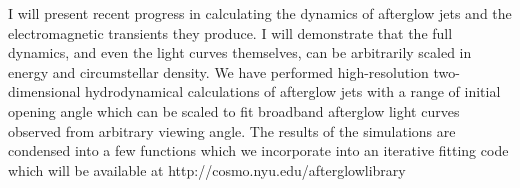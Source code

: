 


\bigskip



\bigskip

\noindent I will present recent progress in calculating the dynamics of
afterglow jets and the electromagnetic transients they produce.  I
will demonstrate that the full dynamics, and even the light curves
themselves, can be arbitrarily scaled in energy and circumstellar
density. We have performed high-resolution two-dimensional
hydrodynamical calculations of afterglow jets with a range of initial
opening angle which can be scaled to fit broadband afterglow light curves
observed from arbitrary viewing angle.  The results of the simulations
are condensed into a few functions which we incorporate into an
iterative fitting code which will be available at
http://cosmo.nyu.edu/afterglowlibrary

